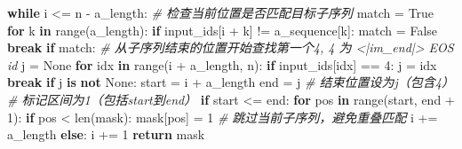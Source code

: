 \documentclass[
]{article}
\newenvironment{Shaded}{}{}
\newcommand{\BuiltInTok}[1]{\textcolor[rgb]{0.00,0.50,0.00}{#1}}
\newcommand{\CommentTok}[1]{\textcolor[rgb]{0.38,0.63,0.69}{\textit{#1}}}
\newcommand{\ControlFlowTok}[1]{\textcolor[rgb]{0.00,0.44,0.13}{\textbf{#1}}}
\newcommand{\DecValTok}[1]{\textcolor[rgb]{0.25,0.63,0.44}{#1}}
\newcommand{\KeywordTok}[1]{\textcolor[rgb]{0.00,0.44,0.13}{\textbf{#1}}}
\newcommand{\NormalTok}[1]{#1}
\newcommand{\OperatorTok}[1]{\textcolor[rgb]{0.40,0.40,0.40}{#1}}
\newcommand{\VariableTok}[1]{\textcolor[rgb]{0.10,0.09,0.49}{#1}}
\begin{document}
\begin{Shaded}
\begin{Highlighting}[]
        \ControlFlowTok{while}\NormalTok{ i }\OperatorTok{\textless{}=}\NormalTok{ n }\OperatorTok{{-}}\NormalTok{ a\_length:}
            \CommentTok{\# 检查当前位置是否匹配目标子序列}
\NormalTok{            match }\OperatorTok{=} \VariableTok{True}
            \ControlFlowTok{for}\NormalTok{ k }\KeywordTok{in} \BuiltInTok{range}\NormalTok{(a\_length):}
                \ControlFlowTok{if}\NormalTok{ input\_ids[i }\OperatorTok{+}\NormalTok{ k] }\OperatorTok{!=}\NormalTok{ a\_sequence[k]:}
\NormalTok{                    match }\OperatorTok{=} \VariableTok{False}
                    \ControlFlowTok{break}
            \ControlFlowTok{if}\NormalTok{ match:}
                \CommentTok{\# 从子序列结束的位置开始查找第一个4, 4 为 \textless{}|im\_end|\textgreater{} EOS id}
\NormalTok{                j }\OperatorTok{=} \VariableTok{None}
                \ControlFlowTok{for}\NormalTok{ idx }\KeywordTok{in} \BuiltInTok{range}\NormalTok{(i }\OperatorTok{+}\NormalTok{ a\_length, n):}
                    \ControlFlowTok{if}\NormalTok{ input\_ids[idx] }\OperatorTok{==} \DecValTok{4}\NormalTok{:}
\NormalTok{                        j }\OperatorTok{=}\NormalTok{ idx}
                        \ControlFlowTok{break}
                \ControlFlowTok{if}\NormalTok{ j }\KeywordTok{is} \KeywordTok{not} \VariableTok{None}\NormalTok{:}
\NormalTok{                    start }\OperatorTok{=}\NormalTok{ i }\OperatorTok{+}\NormalTok{ a\_length}
\NormalTok{                    end }\OperatorTok{=}\NormalTok{ j  }\CommentTok{\# 结束位置设为j（包含4）}
                    \CommentTok{\# 标记区间为1（包括start到end）}
                    \ControlFlowTok{if}\NormalTok{ start }\OperatorTok{\textless{}=}\NormalTok{ end:}
                        \ControlFlowTok{for}\NormalTok{ pos }\KeywordTok{in} \BuiltInTok{range}\NormalTok{(start, end }\OperatorTok{+} \DecValTok{1}\NormalTok{):}
                            \ControlFlowTok{if}\NormalTok{ pos }\OperatorTok{\textless{}} \BuiltInTok{len}\NormalTok{(mask):}
\NormalTok{                                mask[pos] }\OperatorTok{=} \DecValTok{1}
                \CommentTok{\# 跳过当前子序列，避免重叠匹配}
\NormalTok{                i }\OperatorTok{+=}\NormalTok{ a\_length}
            \ControlFlowTok{else}\NormalTok{:}
\NormalTok{                i }\OperatorTok{+=} \DecValTok{1}
        \ControlFlowTok{return}\NormalTok{ mask}


\end{Highlighting}
\end{Shaded}
\end{document}
